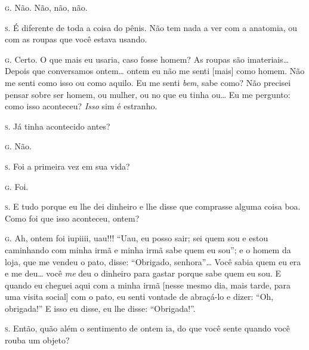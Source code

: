 \noindent\hskip0mm\textsc{g.} Não. Não, não, não.

\noindent\hskip0mm\textsc{s.} É diferente de toda a coisa do pênis. Não tem nada a ver com a
anatomia, ou com as roupas que você estava usando.

\noindent\hskip0mm\textsc{g.} Certo. O que mais eu usaria, caso fosse homem? As roupas são
imateriais\ldots{} Depois que conversamos ontem\ldots{} ontem eu não me senti
[mais] como homem. Não me senti como isso ou como aquilo. Eu me senti
\textit{bem}, sabe como? Não precisei pensar sobre ser homem, ou
mulher, ou no que eu tinha ou\ldots{} Eu me pergunto: como isso aconteceu?
\textit{Isso} sim é estranho.

\noindent\hskip0mm\textsc{s.} Já tinha acontecido antes?

\noindent\hskip0mm\textsc{g.} Não.

\noindent\hskip0mm\textsc{s.} Foi a primeira vez em sua vida?

\noindent\hskip0mm\textsc{g.} Foi.

\noindent\hskip0mm\textsc{s.} E tudo porque eu lhe dei dinheiro e lhe disse que comprasse alguma
coisa boa. Como foi que isso aconteceu, ontem?

\noindent\hskip0mm\textsc{g.} Ah, ontem foi iupiiii, uau!!! ``Uau, eu posso sair; sei
quem sou e estou caminhando com minha irmã e minha irmã sabe quem eu
sou''; e o homem da loja, que me vendeu o pato, disse:
``Obrigado, senhora''\ldots{} Você sabia quem eu
era e me deu\ldots{} você \textit{me} deu o dinheiro para gastar porque sabe
quem eu sou. E quando eu cheguei aqui com a minha irmã [nesse mesmo
dia, mais tarde, para uma visita social] com o pato, eu senti vontade
de abraçá-lo e dizer: ``Oh, obrigada!'' E
isso eu disse, eu lhe disse: ``Obrigada!''.

\noindent\hskip0mm\textsc{s.} Então, quão além o sentimento de ontem ia, do que você sente quando
você rouba um objeto?

